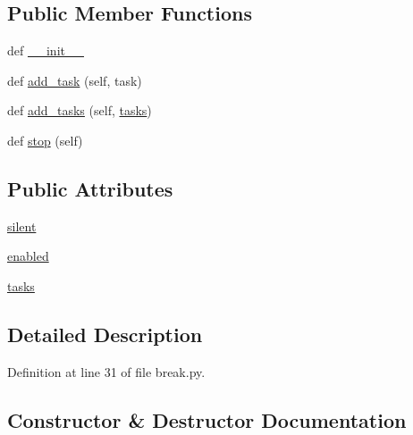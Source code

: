 \subsection*{Public Member Functions}
\begin{DoxyCompactItemize}
\item 
def \hyperlink{classmorunner_1_1break_1_1Break_ad40ba1a8f3e8eb89cf2b49272637af15}{\+\_\+\+\_\+init\+\_\+\+\_\+}
\item 
def \hyperlink{classmorunner_1_1break_1_1Break_aa753a1991e864f09e5c88fa091045a54}{add\+\_\+task} (self, task)
\item 
def \hyperlink{classmorunner_1_1break_1_1Break_a751c8b40ea48a5119871d370e8ed3105}{add\+\_\+tasks} (self, \hyperlink{classmorunner_1_1break_1_1Break_a7d62d6a7a0f7f526ca0a15363eda01d6}{tasks})
\item 
def \hyperlink{classmorunner_1_1break_1_1Break_ae53ddba489aac5ad45172f9c4ad6f634}{stop} (self)
\end{DoxyCompactItemize}
\subsection*{Public Attributes}
\begin{DoxyCompactItemize}
\item 
\hyperlink{classmorunner_1_1break_1_1Break_a4f411d3199721dd388f4511d4075a0cc}{silent}
\item 
\hyperlink{classmorunner_1_1break_1_1Break_a0ca27884fb0c27084b04fb7ab17a7476}{enabled}
\item 
\hyperlink{classmorunner_1_1break_1_1Break_a7d62d6a7a0f7f526ca0a15363eda01d6}{tasks}
\end{DoxyCompactItemize}


\subsection{Detailed Description}


Definition at line 31 of file break.\+py.



\subsection{Constructor \& Destructor Documentation}
\hypertarget{classmorunner_1_1break_1_1Break_ad40ba1a8f3e8eb89cf2b49272637af15}{}
